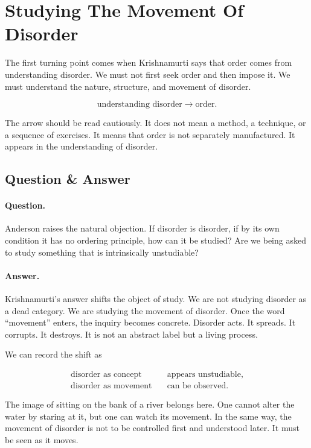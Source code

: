 \section{Studying The Movement Of Disorder}

The first turning point comes when Krishnamurti says that order comes from understanding disorder. We must not first seek order and then impose it. We must understand the nature, structure, and movement of disorder.

\begin{equation}
\text{understanding disorder}
\longrightarrow
\text{order}.
\end{equation}

The arrow should be read cautiously. It does not mean a method, a technique, or a sequence of exercises. It means that order is not separately manufactured. It appears in the understanding of disorder.

\subsection{Question \& Answer}

\paragraph{Question.}
Anderson raises the natural objection. If disorder is disorder, if by its own condition it has no ordering principle, how can it be studied? Are we being asked to study something that is intrinsically unstudiable?

\paragraph{Answer.}
Krishnamurti's answer shifts the object of study. We are not studying disorder as a dead category. We are studying the movement of disorder. Once the word ``movement'' enters, the inquiry becomes concrete. Disorder acts. It spreads. It corrupts. It destroys. It is not an abstract label but a living process.

We can record the shift as

\begin{align}
\text{disorder as concept} &\quad \text{appears unstudiable},\\
\text{disorder as movement} &\quad \text{can be observed}.
\end{align}

The image of sitting on the bank of a river belongs here. One cannot alter the water by staring at it, but one can watch its movement. In the same way, the movement of disorder is not to be controlled first and understood later. It must be seen as it moves.

